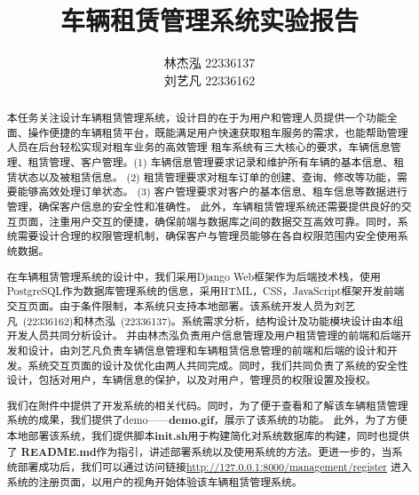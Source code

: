 \documentclass[UTF8,a4paper,12pt]{ctexart}
\title{\textbf{\Large{车辆租赁管理系统实验报告}}}
\author{ 林杰泓 22336137 \\刘艺凡 22336162}
\begin{document}
 
\maketitle

\begin{abstract}
本任务关注设计车辆租赁管理系统，设计目的在于为用户和管理人员提供一个功能全面、操作便捷的车辆租赁平台，既能满足用户快速获取租车服务的需求，也能帮助管理人员在后台轻松实现对租车业务的高效管理
租车系统有三大核心的要求，车辆信息管理、租赁管理、客户管理。(1) 车辆信息管理要求记录和维护所有车辆的基本信息、租赁状态以及被租赁信息。 (2) 租赁管理要求对租车订单的创建、查询、修改等功能，需要能够高效处理订单状态。 (3) 客户管理要求对客户的基本信息、租车信息等数据进行管理，确保客户信息的安全性和准确性。
此外，车辆租赁管理系统还需要提供良好的交互页面，注重用户交互的便捷，确保前端与数据库之间的数据交互高效可靠。同时，系统需要设计合理的权限管理机制，确保客户与管理员能够在各自权限范围内安全使用系统数据。

在车辆租赁管理系统的设计中，我们采用Django Web框架作为后端技术栈，使用PostgreSQL作为数据库管理系统的信息，采用HTML，CSS，JavaScript框架开发前端交互页面。由于条件限制，本系统只支持本地部署。该系统开发人员为刘艺凡~(22336162)和林杰泓~(22336137)。系统需求分析，结构设计及功能模块设计由本组开发人员共同分析设计。
并由林杰泓负责用户信息管理及用户租赁管理的前端和后端开发和设计，由刘艺凡负责车辆信息管理和车辆租赁信息管理的前端和后端的设计和开发。系统交互页面的设计及优化由两人共同完成。同时，我们共同负责了系统的安全性设计，包括对用户，车辆信息的保护，以及对用户，管理员的权限设置及授权。

我们在附件中提供了开发系统的相关代码。同时，为了便于查看和了解该车辆租赁管理系统的成果，我们提供了demo——\textbf{demo.gif}，展示了该系统的功能。
此外，为了方便本地部署该系统，我们提供脚本\textbf{init.sh}用于构建简化对系统数据库的构建，同时也提供了 \textbf{README.md}作为指引，讲述部署系统以及使用系统的方法。更进一步的，当系统部署成功后，我们可以通过访问链接\href{http://127.0.0.1:8000/management/register}{http://127.0.0.1:8000/management/register} 进入系统的注册页面，以用户的视角开始体验该车辆租赁管理系统。

\end{abstract}

 
 
\end{document}
